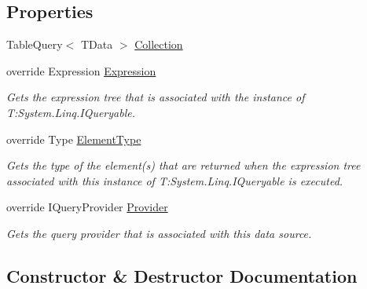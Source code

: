 \subsection*{Properties}
\begin{DoxyCompactItemize}
\item 
Table\+Query$<$ T\+Data $>$ \hyperlink{classCqrs_1_1Azure_1_1BlobStorage_1_1TableStorageStore_a97752ec9c5ad130a230924da9a75a537}{Collection}
\item 
override Expression \hyperlink{classCqrs_1_1Azure_1_1BlobStorage_1_1TableStorageStore_af7d55541709a0519bdb0b5d201c5a97c}{Expression}
\begin{DoxyCompactList}\small\item\em Gets the expression tree that is associated with the instance of T\+:\+System.\+Linq.\+I\+Queryable. \end{DoxyCompactList}\item 
override Type \hyperlink{classCqrs_1_1Azure_1_1BlobStorage_1_1TableStorageStore_a57e68c383098e81303eeebe0b85c970c}{Element\+Type}
\begin{DoxyCompactList}\small\item\em Gets the type of the element(s) that are returned when the expression tree associated with this instance of T\+:\+System.\+Linq.\+I\+Queryable is executed. \end{DoxyCompactList}\item 
override I\+Query\+Provider \hyperlink{classCqrs_1_1Azure_1_1BlobStorage_1_1TableStorageStore_a95c1b0fce651992dd6bd75f44da15829}{Provider}
\begin{DoxyCompactList}\small\item\em Gets the query provider that is associated with this data source. \end{DoxyCompactList}\end{DoxyCompactItemize}


\subsection{Constructor \& Destructor Documentation}
\mbox{\label{classCqrs_1_1Azure_1_1BlobStorage_1_1TableStorageStore_aabc36bc46ffb22b716cc7769a641cfab}} 
